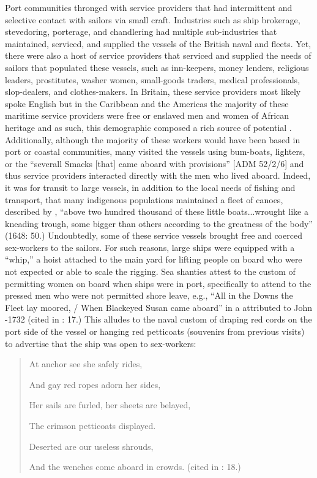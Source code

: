 Port communities thronged with service providers that had intermittent and selective contact with sailors via small craft. Industries such as ship brokerage, stevedoring, porterage, and chandlering had multiple sub-industries that maintained, serviced, and supplied the vessels of the British naval and  fleets. Yet, there were also a host of service providers that serviced and supplied the needs of sailors that populated these vessels, such as inn-keepers, money lenders, religious leaders, prostitutes, washer women, small-goods traders, medical professionals, slop-dealers, and clothes-makers. In Britain, these service providers most likely spoke English but in the Caribbean and the Americas the majority of these maritime service providers were free or enslaved men and women of African heritage \citep[259]{Jarvis2010} and as such, this demographic composed a rich source of potential . Additionally, although the majority of these workers would have been based in port or coastal communities, many visited the vessels using bum-boats, lighters, or the “severall Smacks [that] came aboard with provisions” [ADM 52/2/6] and thus service providers interacted directly with the men who lived aboard. Indeed, it was for transit to large vessels, in addition to the local needs of fishing and transport, that many indigenous populations maintained a fleet of canoes, described by \citeauthor{Gage1648}, “above two hundred thousand of these little boats...wrought like a kneading trough, some bigger than others according to the greatness of the body” (1648: 50.) Undoubtedly, some of these service vessels brought free and coerced sex-workers to the sailors. For such reasons, large ships were equipped with a “whip,” a hoist attached to the main yard for lifting people on board who were not expected or able to scale the rigging. Sea shanties attest to the custom of permitting women on board when ships were in port, specifically to attend to the pressed men who were not permitted shore leave, e.g.,  “All in the Downs the Fleet lay moored, / When Blackeyed Susan came aboard” in a  attributed to John \citealt{Gay1685}-1732 (cited in \citealt{Hugill1969}: 17.) This  alludes to the naval custom of draping red cords on the port side of the vessel or hanging red petticoats (souvenirs from previous visits) to advertise that the ship was open to sex-workers: 

\begin{quotation}
At anchor see she safely rides, 

And gay red ropes adorn her sides, 

Her sails are furled, her sheets are belayed, 

The crimson petticoats displayed. 

Deserted are our useless shrouds, 

And the wenches come aboard in crowds. (cited in \citealt{Hugill1969}: 18.)
\end{quotation}

